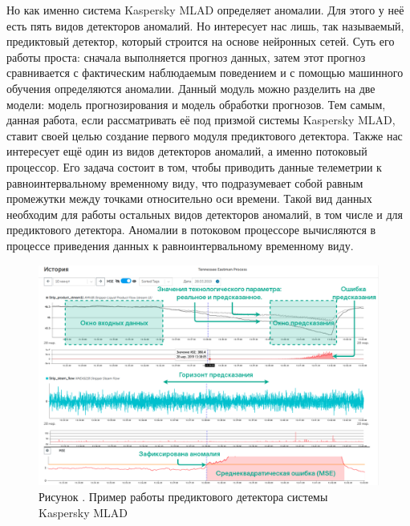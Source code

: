 {  \par \redline Но как именно система Kaspersky MLAD определяет аномалии. Для этого у неё есть пять видов детекторов аномалий. Но интересует нас лишь, так называемый, предиктовый детектор, который строится на основе нейронных сетей. Суть его работы проста: сначала выполняется прогноз данных, затем этот прогноз сравнивается с фактическим наблюдаемым поведением и с помощью машинного обучения определяются аномалии. Данный модуль можно разделить на две модели: модель прогнозирования и модель обработки прогнозов. Тем самым, данная работа, если рассматривать её под призмой системы Kaspersky MLAD, ставит своей целью создание первого модуля предиктового детектора. Также нас интересует ещё один из видов детекторов аномалий, а именно потоковый процессор. Его задача состоит в том, чтобы приводить данные телеметрии к равноинтервальному временному виду, что подразумевает собой равным промежутки между точками относительно оси времени. Такой вид данных необходим для работы остальных видов детекторов аномалий, в том числе и для предиктового детектора. Аномалии в потоковом процессоре вычисляются в процессе приведения данных к равноинтервальному временному виду.

  \begin{figure}
    \centering
    \def\svgwidth{\textwidth}
    \includegraphics[scale=0.6]{images/MLADex.png}
    \caption*{\gostFont Рисунок \thechaptercntr .\theimagecntr \spc {--} Пример работы предиктового детектора системы Kaspersky MLAD}
    \label{fig:MLADBlackBox}
  \end{figure} 

}
